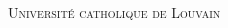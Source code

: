 
\begin{titlepage}

\begin{center}


\textsc{\LARGE Université catholique de Louvain}

\vspace{4.0cm}

\begin{spacing}{2.5}
\textsc{\Large \reportsubject}\\[0.5cm]
{\huge \bfseries \reporttitle}\\[0.4cm]
 \end{spacing}

\begin{minipage}[t]{0.5\textwidth}
  \begin{flushleft} \large
    
  \end{flushleft}
\end{minipage}

\vfill
\reportauthor \\
\reportdate

\end{center}

\end{titlepage}
